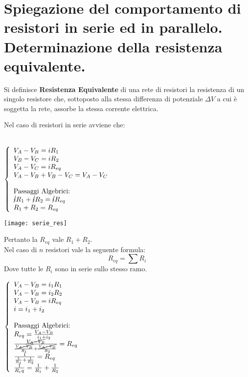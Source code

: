 \section{Spiegazione del comportamento di resistori in serie ed in
	parallelo. Determinazione della resistenza equivalente.}

Si definisce \textbf{Resistenza Equivalente} di una rete di resistori la resistenza di un singolo resistore che, sottoposto alla stessa differenza di potenziale $\Delta V$ a cui \`e soggetta la rete, assorbe la stessa corrente elettrica.

Nel caso di resistori in serie avviene che:\\
\\
\noindent\begin{minipage}{0.3\textwidth}
$
\left\{
\begin{array}{lr}
	V_A - V_B = i R_1 \\	
	V_B - V_C = i R_2	\\	
	V_A - V_C = i R_{eq} \\
	V_A - V_B + V_B - V_C = V_A - V_C \\
	\\
	\textnormal{Passaggi Algebrici:}\\
	\cancel{i} R_1 + \cancel{i} R_2 = \cancel{i} R_{eq} \\
	R_1 + R_2 = R_{eq}
\end{array}
\right.
$
\end{minipage}
\hfill%
\begin{minipage}{0.6\textwidth}\raggedleft
	\texttt{[image: serie\_res]}
\end{minipage}
Pertanto la $R_{eq}$ vale $R_1 + R_2$.\\
Nel caso di $n$ resistori vale la seguente formula:
\begin{equation}
    R_{eq} = \sum{R_i}
\end{equation}
Dove tutte le $R_i$ sono in serie sullo stesso ramo.\\
\noindent\begin{minipage}{0.3\textwidth}
	$
	\left\{
	\begin{array}{lr}
	V_A - V_B = i_1 R_1 \\	
	V_A - V_B = i_2 R_2	\\	
	V_A - V_B = i R_{eq} \\
	i = i_1 + i_2 \\
	\\
	\textnormal{Passaggi Algebrici:}\\
	R_{eq} = \frac{V_A - V_B}{i_1 + i_2}\\
	\frac{\cancel{V_A - V_B}}{\frac{\cancel{V_A - V_B}}{R_1} + \frac{\cancel{V_A - V_B}}{R_2}} = R_{eq}\\	
	\frac{1}{\frac{1}{R_1} + \frac{1}{R_2}} = R_{eq}\\	
	\frac{1}{R_eq} = \frac{1}{R_1} + \frac{1}{R_2}
	\end{array}
	\right.
	$
\end{minipage}
